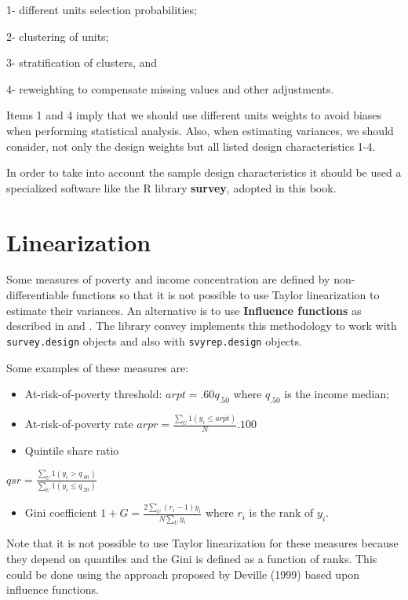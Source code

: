 \documentclass[]{book}
\providecommand{\tightlist}{%
  \setlength{\itemsep}{0pt}\setlength{\parskip}{0pt}}
\begin{document}
1- different units selection probabilities;

2- clustering of units;

3- stratification of clusters, and

4- reweighting to compensate missing values and other adjustments.

Items 1 and 4 imply that we should use different units weights to avoid
biases when performing statistical analysis. Also, when estimating
variances, we should consider, not only the design weights but all
listed design characteristics 1-4.

In order to take into account the sample design characteristics it
should be used a specialized software like the R library
\textbf{survey}, adopted in this book.

\section{Linearization}\label{linearization}

Some measures of poverty and income concentration are defined by
non-differentiable functions so that it is not possible to use Taylor
linearization to estimate their variances. An alternative is to use
\textbf{Influence functions} as described in \citep{deville1999} and
\citep{osier2009}. The library convey implements this methodology to
work with \texttt{survey.design} objects and also with
\texttt{svyrep.design} objects.

Some examples of these measures are:

\begin{itemize}
\item
  At-risk-of-poverty threshold: \(arpt=.60q_{.50}\) where \(q_{.50}\) is
  the income median;
\item
  At-risk-of-poverty rate \(arpr=\frac{\sum_U 1(y_i \leq arpt)}{N}.100\)
\item
  Quintile share ratio
\end{itemize}

\(qsr=\frac{\sum_U 1(y_i>q_{.80})}{\sum_U 1(y_i\leq q_{.20})}\)

\begin{itemize}
\tightlist
\item
  Gini coefficient \(1+G=\frac{2\sum_U (r_i-1)y_i}{N\sum_Uy_i}\) where
  \(r_i\) is the rank of \(y_i\).
\end{itemize}

Note that it is not possible to use Taylor linearization for these
measures because they depend on quantiles and the Gini is defined as a
function of ranks. This could be done using the approach proposed by
Deville (1999) based upon influence functions.
\end{document}

